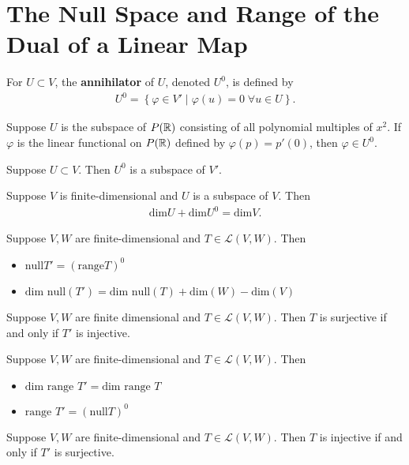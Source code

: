 \documentclass{memoir}
\begin{document}
\section{The Null Space and Range of the Dual of a Linear Map}	
\begin{defn}[Annihilator]
	For $U \subset V$, the \textbf{annihilator} of $U $, denoted $U^{0}$, is defined by
	\begin{align*}
		U^{0} = \left\{\varphi\in V' \mid \varphi(u) = 0 \; \forall u \in U \right\} .
	\end{align*}
\end{defn}
\begin{exmp}
	Suppose $U$ is the subspace of $P(\mathbb{R})$ consisting of all polynomial multiples of $x^2$. If $\varphi $ is the linear functional on $P(\mathbb{R})$ defined by $\varphi(p) = p'(0)$, then $\varphi \in U^{0}.$
\end{exmp}
\begin{cor}
	Suppose $U \subset V$. Then $U^{0}$ is a subspace of $V'$.
\end{cor}
\begin{thm}
	Suppose $V$ is finite-dimensional and $U$ is a subspace of $V$. Then
	\begin{align*}
		\textrm{dim}U + \textrm{dim}U^0 = \textrm{dim}V.
	\end{align*}
\end{thm}
\begin{thm}
	Suppose $V,W$ are finite-dimensional and $T \in \mathcal{L}(V,W)$. Then
	\begin{itemize}
		\item $\textrm{null}T' = ( \textrm{range}T)^{0}$
		\item $ \textrm{dim} \textrm{ null} (T') = \textrm{dim} \textrm{ null} (T) + \textrm{dim} (W) - \textrm{dim} (V)$
	\end{itemize}
\end{thm}
\begin{cor}
	Suppose $V,W$ are finite dimensional and $T \in \mathcal{L}(V,W)$. Then $T$ is surjective if and only if $T'$ is injective.
\end{cor}
\begin{thm}[Range of $T'$ ]
	Suppose $V,W$ are finite-dimensional and $T \in \mathcal{L}(V,W)$. Then
	\begin{itemize}
		\item $ \textrm{dim} \textrm{ range }T' = \textrm{dim} \textrm{ range }T $
		\item $\textrm{range }T' = ( \textrm{null} T)^0$
	\end{itemize}
\end{thm}
\begin{cor}
	Suppose $V,W$ are finite-dimensional and $T \in \mathcal{L}(V,W)$. Then $T$ is injective if and only if $T'$ is surjective.
\end{cor}
\end{document}

